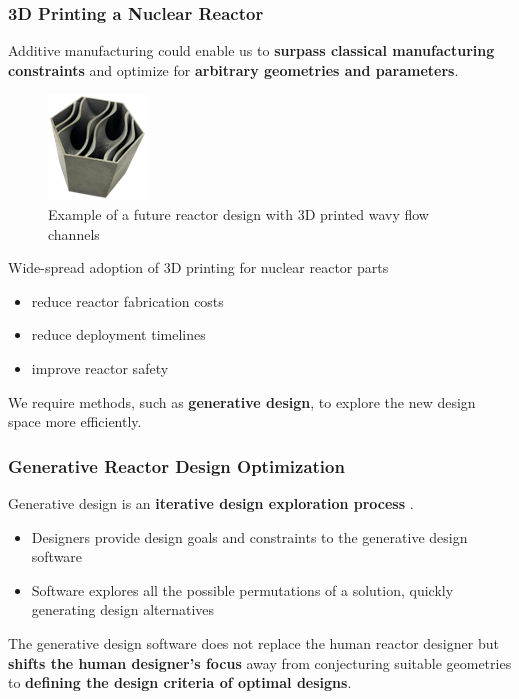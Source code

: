 \begin{frame}
    \frametitle{3D Printing a Nuclear Reactor}
    Additive manufacturing could enable us to \textbf{surpass classical 
    manufacturing constraints} and optimize for \textbf{arbitrary geometries and 
    parameters}. 
    \begin{figure}[]
        \includegraphics[width=0.2\linewidth]{figures/wavy-channels.png}
        \caption{Example of a future reactor design with 3D printed wavy flow channels}
    \end{figure}
    Wide-spread adoption of 3D printing for nuclear reactor parts 
    \begin{itemize}
        \item reduce reactor fabrication costs 
        \item reduce deployment timelines 
        \item improve reactor safety 
    \end{itemize}
    \vspace{0.2cm}
    We require methods, such as \textbf{generative design}, to explore the 
    new design space more efficiently. 
\end{frame}

  \begin{frame}
    \frametitle{Generative Reactor Design Optimization}
    Generative design is an \textbf{iterative design exploration process} \cite{autodesk_autodesk_2020}. 
    \begin{itemize}
        \item Designers provide design goals and constraints to the generative design 
        software
        \item Software explores all the possible permutations of a solution, quickly generating 
        design alternatives
    \end{itemize}

    The generative design software does not replace the human reactor designer but 
    \textbf{shifts the human designer's focus} away from conjecturing suitable geometries 
    to \textbf{defining the design criteria of optimal designs}.
    
  \end{frame}

